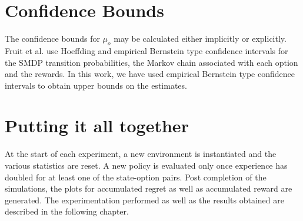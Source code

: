 \section{Confidence Bounds}

The confidence bounds for $\mu_o$ may be calculated either implicitly or explicitly.
Fruit et al. \cite{fruit_regret_2017} use Hoeffding and empirical Bernstein type confidence intervals for the SMDP transition probabilities, the Markov chain associated with each option and the rewards.
In this work, we have used empirical Bernstein type confidence intervals to obtain upper bounds on the estimates.


\section{Putting it all together}

At the start of each experiment, a new environment is instantiated and the various statistics are reset.
A new policy is evaluated only once experience has doubled for at least one of the state-option pairs.
Post completion of the simulations, the plots for accumulated regret as well as accumulated reward are generated.
The experimentation performed as well as the results obtained are described in the following chapter.
